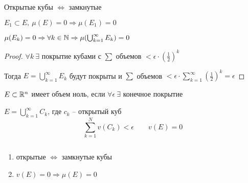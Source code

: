     \begin{remark}
        Открытые кубы $\Leftrightarrow$ замкнутые
    \end{remark}
    \begin{remark}
        $E_1 \subset E, \ \mu(E) = 0 \Rightarrow \mu(E_1) = 0$
    \end{remark}

    \begin{lemma}
        $\mu(E_k) = 0 \Rightarrow \forall k \in \mathbb{N} \Rightarrow \mu(\bigcup_{k=1}^\infty E_k) = 0$
    \end{lemma}

    \begin{proof}
        $\forall k \ \exists$ покрытие кубами с $\sum$ объемов $ < \epsilon \cdot (\frac{1}{2})^k$
        \par Тогда $E = \bigcup_{k=1}^\infty E_k$ будут покрыты и $\sum$ объемов $< \epsilon \cdot \sum_{k=1}^\infty (\frac 1 2)^k = \epsilon$
    \end{proof}

    \begin{definition}
        $E \subset \mathbb{R}^n$ имеет объем ноль, если $\forall \epsilon \ \exists$ конечное покрытие
        \par $E = \bigcup_{k=1}^\infty C_k$, где $c_k$ -- открытый куб
        \[
            \sum_{k=1}^N v(C_k) < \epsilon \quad \quad v(E) = 0   
        \]
    \end{definition}

    \begin{remark}
        $ $
        \begin{enumerate}
            \item открытые $\Leftrightarrow$ замкнутые кубы
            \item $v(E) = 0 \Rightarrow \mu(E) = 0$
        \end{enumerate}
    \end{remark}

